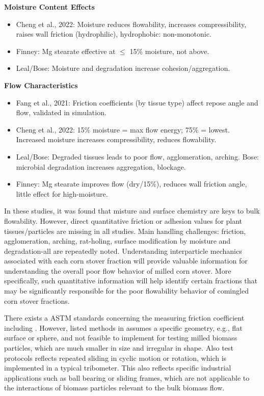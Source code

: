 \documentclass[xcolor=dvipsnames,10pt,hidelinks]{article}
\begin{document}
\textbf{\textbf{Moisture Content Effects}}
\begin{itemize}
\item Cheng et al., 2022: Moisture reduces flowability, increases compressibility, raises wall friction (hydrophilic), hydrophobic: non-monotonic.
\item Finney: Mg stearate effective at \(\leq\) 15\% moisture, not above.
\item Leal/Bose: Moisture and degradation increase cohesion/aggregation.
\end{itemize}

\textbf{\textbf{Flow Characteristics}}
\begin{itemize}
\item Fang et al., 2021: Friction coefficients (by tissue type) affect repose angle and flow, validated in simulation.
\item Cheng et al., 2022: 15\% moisture = max flow energy; 75\% = lowest. Increased moisture increases compressibility, reduces flowability.
\item Leal/Bose: Degraded tissues leads to poor flow, agglomeration, arching. Bose: microbial degradation increases aggregation, blockage.
\item Finney: Mg stearate improves flow (dry/15\%), reduces wall friction angle, little effect for high-moisture.
\end{itemize}

In these studies, it was found that misture and surface chemistry are keys to bulk flowability.
However, direct quantitative friction or adhesion values for plant tissues/particles are missing in all studies.
Main handling challenges: friction, agglomeration, arching, rat-holing, surface modification by moisture and degradation-all are repeatedly noted.
Understanding interparticle mechanics associated with each corn stover fraction will provide valuable information for understanding the overall poor flow behavior of milled corn stover.
More specifically, such quantitative information will help identify certain fractions that may be significantly responsible for the poor flowability behavior of comingled corn stover fractions.

There exists a ASTM standards concerning the measuring friction coefficient including \textcite{astmg115-10GuideMeasuringReporting2018}.
However, listed methods in \textcite{astmg115-10GuideMeasuringReporting2018} assumes a specific geometry, e.g., flat surface or sphere, and not feasible to implement for testing milled biomass particles, which are much smaller in size and irregular in shape.
Also test protocols reflects repeated sliding in cyclic motion or rotation, which is implemented in a typical tribometer.
This also reflects specific industrial applications such as ball bearing or sliding frames, which are not applicable to the interactions of biomass particles relevant to the bulk biomass flow.
\end{document}
